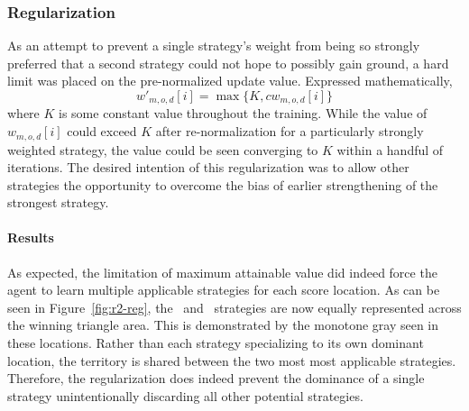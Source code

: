 

\subsubsection{Regularization}


As an attempt to prevent a single strategy's weight from being so strongly 
preferred that a second strategy could not hope to possibly gain ground,
a hard limit was placed on the pre-normalized update value.
%
Expressed mathematically,
\[
    w'_{m,o,d}[i] = \max\{K,cw_{m,o,d}[i]\}
\]
where $K$ is some constant value throughout the training.
%
While the value of $w_{m,o,d}[i]$ could exceed $K$ after re-normalization
for a particularly strongly weighted strategy,
the value could be seen converging to $K$ within a handful of iterations.
%
The desired intention of this regularization was to allow other strategies
the opportunity to overcome the bias of earlier strengthening of the strongest
strategy.

\paragraph{Results}







As expected,
the limitation of maximum attainable value did indeed force the agent to learn
multiple applicable strategies for each score location.
%
As can be seen in Figure~\ref{fig:r2-reg},
the \handmaxmin\ and \handmaxavg\ strategies are now equally represented across
the winning triangle area.
%
This is demonstrated by the monotone gray seen in these locations.
%
Rather than each strategy specializing to its own dominant location,
the territory is shared between the two most most applicable strategies.
%
Therefore,
the regularization does indeed prevent the dominance of a single strategy
unintentionally discarding all other potential strategies.

